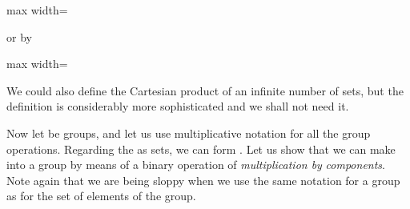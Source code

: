 \documentclass[11pt,oneside]{article}
\begin{document}
\begin{BookBody}
\begin{center}\begin{adjustbox}{max width=\linewidth}\end{adjustbox}\end{center}

\noindent or by

\begin{center}\begin{adjustbox}{max width=\linewidth}\end{adjustbox}\end{center} \BookEnd{\blacksquare}

We could also define the Cartesian product of an infinite number of sets, but the definition is considerably more sophisticated and we shall not need it.

Now let  be groups, and let us use multiplicative notation for all the group operations. Regarding the  as sets, we can form . Let us show that we can make  into a group by means of a binary operation of\textit{ multiplication by} \textit{components}. Note again that we are being sloppy when we use the same notation for a group as for the set of elements of the group.

\end{BookBody}

\BookNarrativetrue
\end{document}
